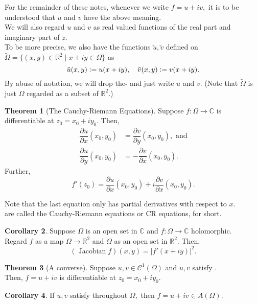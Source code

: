 \documentclass[12pt,oneside]{book}
\theoremstyle{definition}
\newtheorem{thm}{Theorem}
\numberwithin{thm}{chapter}
\newtheorem{cor}[thm]{Corollary}
\begin{document}
For the remainder of these notes, whenever we write $f = u + iv,$ it is to be understood that $u$ and $v$ have the above meaning.\\
We will also regard $u$ and $v$ as real valued functions of the real part and imaginary part of $z.$ \\
To be more precise, we also have the functions $\tilde u, \tilde v$ defined on $\tilde{\Omega} = \{(x, y) \in \mathbb{R}^2 \mid x + iy \in \Omega\}$ as
\begin{equation*} 
 	\tilde u(x, y) \vcentcolon= u(x + iy), \quad \tilde v(x, y) \vcentcolon= v(x + iy).
 \end{equation*} 
 By abuse of notation, we will drop the $\tilde {}$ and just write $u$ and $v.$ (Note that $\tilde{\Omega}$ is just $\Omega$ regarded as a subset of $\mathbb{R}^2.$)

\begin{thm}[The Cauchy-Riemann Equations]\label{thm:cr}
	Suppose $f:\Omega\to\mathbb{C}$ is differentiable at $z_0 = x_0 + iy_0.$ Then,
	\begin{align} 
		\dfrac{\partial u}{\partial x}(x_0, y_0) &= \dfrac{\partial v}{\partial y}(x_0, y_0), \text{ and} \label{eq:cr1}\\
		\dfrac{\partial u}{\partial y}(x_0, y_0) &= -\dfrac{\partial v}{\partial x}(x_0, y_0). \label{eq:cr2}
	\end{align}
	Further,
	\begin{equation*} 
		f'(z_0) = \dfrac{\partial u}{\partial x}(x_0, y_0) + i\dfrac{\partial v}{\partial x}(x_0, y_0).
	\end{equation*}
\end{thm}
Note that the last equation only has partial derivatives with respect to $x.$\\
 are called the Cauchy-Riemann equations or CR equations, for short.
\begin{cor}
	Suppose $\Omega$ is an open set in $\mathbb{C}$ and $f:\Omega \to \mathbb{C}$ holomorphic.\\
	Regard $f$ as a map $\Omega \to \mathbb{R}^2$ and $\Omega$ as an open set in $\mathbb{R}^2.$ Then,
	\begin{equation*} 
		(\operatorname{Jacobian} f)(x, y) = |f'(x+iy)|^2.
	\end{equation*}
\end{cor}
\begin{thm}[A converse]
	Suppose $u, v \in \mathcal{C}^1(\Omega)$ and $u, v$ satisfy .\\
	Then, $f = u + iv$ is differentiable at $z_0 = x_0 + iy_0.$
\end{thm}
\begin{cor}\label{cor:crconv}
	If $u, v$ satisfy  throughout $\Omega,$ then $f = u + iv \in A(\Omega)$.
\end{cor}
\end{document}
